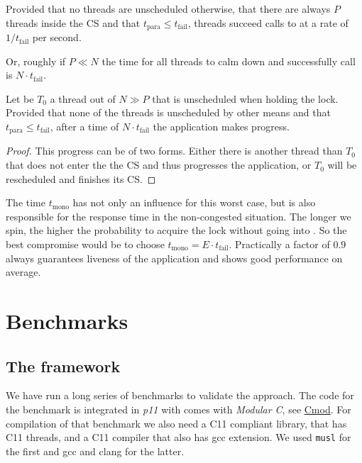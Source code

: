 \begin{lemma}
Provided that no threads are unscheduled otherwise, that there are
always $P$ threads inside the CS and that $t_{\textrm{para}} \leq
    t_{\textrm{fail}}$, threads succeed calls to  at a rate of
$1/t_{\textrm{fail}}$ per second.
\end{lemma}

Or, roughly if $P \ll N$ the time for all threads to calm down and
successfully call  is $N\cdot t_{\textrm{fail}}$.
\fi

\begin{theorem}
Let be $T_0$ a thread out of $N \gg P$ that is unscheduled when
holding the lock.  Provided that none of the threads is
unscheduled by other means and that $t_{\textrm{para}} \leq
    t_{\textrm{fail}}$, after a time of $N\cdot t_{\textrm{fail}}$ the
application makes progress.
\end{theorem}

\iflong
\begin{proof}
This progress can be of two forms.  Either there is another thread
than $T_{0}$ that does not enter the the CS and thus
progresses the application, or $T_0$ will be rescheduled and
finishes its CS.
\end{proof}

The time $t_{\textrm{mono}}$ has not only an influence for this
worst case, but is also responsible for the response time in the
non-congested situation. The longer we spin, the higher the
probability to acquire the lock without going into
. So the best compromise would be to choose
$t_{\textrm{mono}} = E\cdot t_{\textrm{fail}}$. Practically a
factor of 0.9 always guarantees liveness of the application and
shows good performance on average.
\fi

\section{Benchmarks}
\label{sec-4}

\iflong%
\subsection{The framework}
\label{sec-4-1}

We have run a long series of benchmarks to validate the
approach. The code for the benchmark is integrated in \emph{p11} with
comes with \emph{Modular C}, see
\href{http://cmod.gforge.inria.fr}{Cmod}. For compilation of that
benchmark we also need a C11 compliant library, that has C11
threads, and a C11 compiler that also has gcc extension. We used
\texttt{musl} for the first and gcc and clang for the latter.

